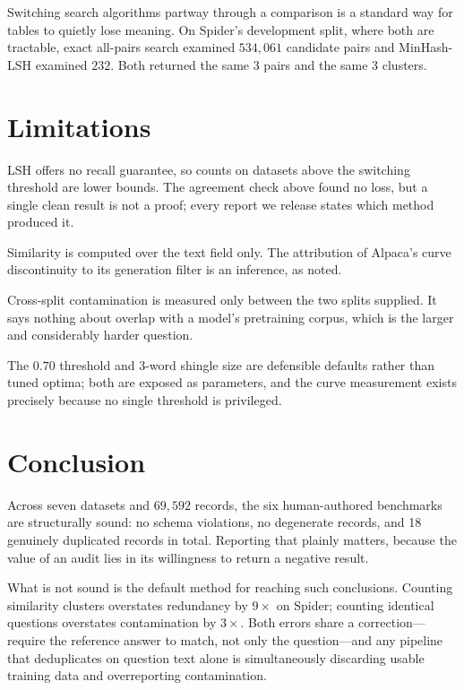 \documentclass[11pt]{article}
\begin{document}
Switching search algorithms partway through a comparison is a standard way for
tables to quietly lose meaning. On Spider's development split, where both are
tractable, exact all-pairs search examined $534{,}061$ candidate pairs and
MinHash-LSH examined $232$. Both returned the same 3 pairs and the same 3
clusters.

\section{Limitations}

LSH offers no recall guarantee, so counts on datasets above the switching
threshold are lower bounds. The agreement check above found no loss, but a
single clean result is not a proof; every report we release states which method
produced it.

Similarity is computed over the text field only. The attribution of Alpaca's
curve discontinuity to its generation filter is an inference, as noted.

Cross-split contamination is measured only between the two splits supplied. It
says nothing about overlap with a model's pretraining corpus, which is the
larger and considerably harder question.

The $0.70$ threshold and $3$-word shingle size are defensible defaults rather
than tuned optima; both are exposed as parameters, and the curve measurement
exists precisely because no single threshold is privileged.

\section{Conclusion}

Across seven datasets and $69{,}592$ records, the six human-authored benchmarks
are structurally sound: no schema violations, no degenerate records, and 18
genuinely duplicated records in total. Reporting that plainly matters, because
the value of an audit lies in its willingness to return a negative result.

What is not sound is the default method for reaching such conclusions. Counting
similarity clusters overstates redundancy by $9\times$ on Spider; counting
identical questions overstates contamination by $3\times$. Both errors share a
correction---require the reference answer to match, not only the
question---and any pipeline that deduplicates on question text alone is
simultaneously discarding usable training data and overreporting contamination.
\end{document}
